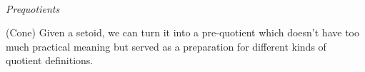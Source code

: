 \begin{code}
\\
%
\\
\> \AgdaSymbol{:} \AgdaSymbol{\{} \AgdaSymbol{:} \AgdaSymbol{\}\{} \AgdaSymbol{:} \AgdaSymbol{\}\{}  \AgdaSymbol{:} \AgdaSymbol{\}(} \AgdaSymbol{:}   \AgdaSymbol{)\{} \AgdaSymbol{:} \AgdaSymbol{\}}\<%
\\
\>[0]\<[7]%
\>[7]   \AgdaBound{\_}  \AgdaSymbol{)}    \<%
\\
\>  \AgdaSymbol{=} \<%
\\
%
\\
\>\<\end{code}

\emph{Prequotients}

(Cone) Given a setoid, we can turn it into a pre-quotient which doesn't have too much practical meaning but served as a preparation for different kinds of quotient definitions.

